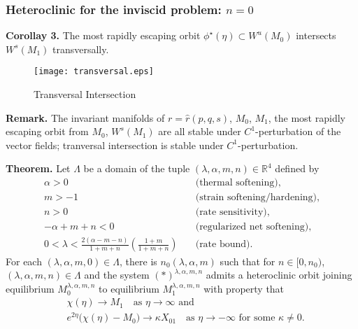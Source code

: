 \documentclass{beamer}
\def\blue{\color{blue}}
\begin{document}
\begin{frame}
 \frametitle{Heteroclinic for the inviscid problem: $n=0$}
 {\bf Corollay 3.} The most rapidly escaping orbit $\phi^\star(\eta)\subset W^u(M_0)$ intersects $W^s(M_1)$ transversally.
   \begin{figure}
  \centering
    \texttt{[image: transversal.eps]}
    \caption{Transversal Intersection}
 \end{figure}
 
 \vskip -8pt
{\bf Remark.} The invariant manifolds of {\blue $r=\hat{r}(p,q,s)$, $M_0$, $M_1$, the most rapidly escaping orbit from $M_0$, $W^s(M_1)$} are all stable under $C^1$-perturbation of the vector fields; tranversal intersection is stable under $C^1$-perturbation. 
\end{frame}

\begin{frame}
  {\bf Theorem.} Let $\Lambda$ be a domain of the tuple $(\lambda,\alpha,m,n)\in\mathbb{R}^4$ defined by %
  {\scriptsize
 \begin{align*}
  \alpha>0\quad&\text{(thermal softening)},\\
  m>-1 \quad&\text{(strain softening/hardening)}, \\%
  n>0 \quad&\text{(rate sensitivity)},\\ %
  -\alpha+m+n<0 \quad&\text{(regularized net softening)}, \\%
  0< \lambda < \frac{2(\alpha-m-n)}{1+m+n}\left(\frac{1+m}{1+m+n}\right) \quad&\text{(rate bound)}. %
\end{align*}}
 For each $(\lambda,\alpha,m,0) \in \Lambda$, there is $n_0( \lambda,\alpha,m)$ such that for $n \in [0, n_0)$, $(\lambda,\alpha,m,n) \in \Lambda$ and the system $(*)^{\lambda,\alpha,m,n}$ admits a heteroclinic orbit joining equilibrium $M_0^{\lambda,\alpha,m,n}$ to equilibrium $M_1^{\lambda,\alpha,m,n}$ with property that
    \begin{align*}%
        &\chi(\eta) \rightarrow M_1 \quad \text{as $\eta \rightarrow \infty$ and} \\
        &e^{2\eta}\big(\chi(\eta) - M_0\big) \rightarrow \kappa X_{01} \quad \text{as $\eta \rightarrow -\infty$ for some $\kappa\ne0$}.
    \end{align*}
\end{frame}
\end{document}
